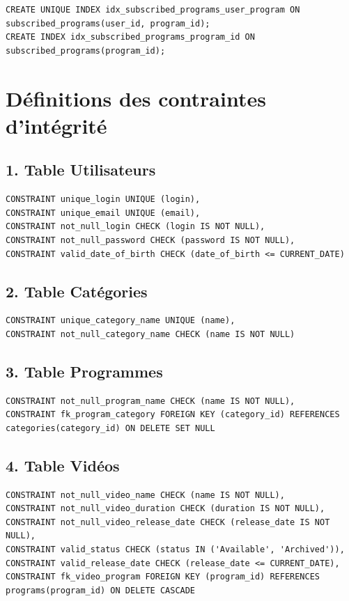 \documentclass[a4paper, 12pt]{article}
\begin{document}
\begin{lstlisting}
CREATE UNIQUE INDEX idx_subscribed_programs_user_program ON subscribed_programs(user_id, program_id);
CREATE INDEX idx_subscribed_programs_program_id ON subscribed_programs(program_id);
\end{lstlisting}

\section*{Définitions des contraintes d'intégrité}

\subsection*{1. Table Utilisateurs}

\begin{lstlisting}
CONSTRAINT unique_login UNIQUE (login),
CONSTRAINT unique_email UNIQUE (email),
CONSTRAINT not_null_login CHECK (login IS NOT NULL),
CONSTRAINT not_null_password CHECK (password IS NOT NULL),
CONSTRAINT valid_date_of_birth CHECK (date_of_birth <= CURRENT_DATE)
\end{lstlisting}

\subsection*{2. Table Catégories}

\begin{lstlisting}
CONSTRAINT unique_category_name UNIQUE (name),
CONSTRAINT not_null_category_name CHECK (name IS NOT NULL)
\end{lstlisting}

\subsection*{3. Table Programmes}

\begin{lstlisting}
CONSTRAINT not_null_program_name CHECK (name IS NOT NULL),
CONSTRAINT fk_program_category FOREIGN KEY (category_id) REFERENCES categories(category_id) ON DELETE SET NULL
\end{lstlisting}

\subsection*{4. Table Vidéos}

\begin{lstlisting}
CONSTRAINT not_null_video_name CHECK (name IS NOT NULL),
CONSTRAINT not_null_video_duration CHECK (duration IS NOT NULL),
CONSTRAINT not_null_video_release_date CHECK (release_date IS NOT NULL),
CONSTRAINT valid_status CHECK (status IN ('Available', 'Archived')),
CONSTRAINT valid_release_date CHECK (release_date <= CURRENT_DATE),
CONSTRAINT fk_video_program FOREIGN KEY (program_id) REFERENCES programs(program_id) ON DELETE CASCADE
\end{lstlisting}
\end{document}
